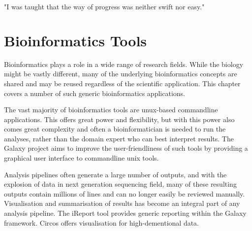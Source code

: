 \begin{savequote}[75mm]
"I was taught that the way of progress was neither swift nor easy."
\end{savequote}

\chapter{Bioinformatics Tools}\label{chapter:general}
\setcounter{figure}{-1}
\setcounter{table}{-1}
\setcounter{section}{-1}
\setcounter{NAT@ctr}{-1}

\begin{comment}
iReport, Circos?, myFAIR?, Galaxy2018update? (I am co-author and technically everybody is
shared first on that? would fit nicely with the overall story as every other paper connects
to Galaxy.)
- Training paper in its own section or add it here?
\end{comment}

Bioinformatics plays a role in a wide range of research fields. While the biology might be vastly different, many of the underlying bioinformatics concepts are shared and may be reused regardless of the scientific application. This chapter covers a number of such generic bioinformatics applications.

The vast majority of bioinformatics tools are unux-based commandline applications. This offers great power and flexibility, but with this power also comes great complexity and often a bioinformatician is needed to run the analyses, rather than the domain expert who can best interpret results. The Galaxy project aims to improve the user-friendliness of such tools by providing a graphical user interface to commandline unix tools.

Analysis pipelines often generate a large number of outputs, and with the explosion of data in next generation sequencing field, many of these resulting outputs contain millions of lines and can no longer easily be reviewed manually. Visualisation and summarisation of results has become an integral part of any analysis pipeline. The iReport tool provides generic reporting within the Galaxy framework. Circos offers visualisation for high-dementional data.

\begin{comment}
Contents of this chapter:
\begin{enumerate}
\itemsep-0.5em
\item The Galaxy platform for accessible, reprodu- cible and collaborative biomedical analyses: 2018 update
\item iReport: A generalised Galaxy solution for integrated experimental reporting
\item Galactic Circos: Visualisation of high-dimensional data in Galaxy
\end{enumerate}
\end{comment}
